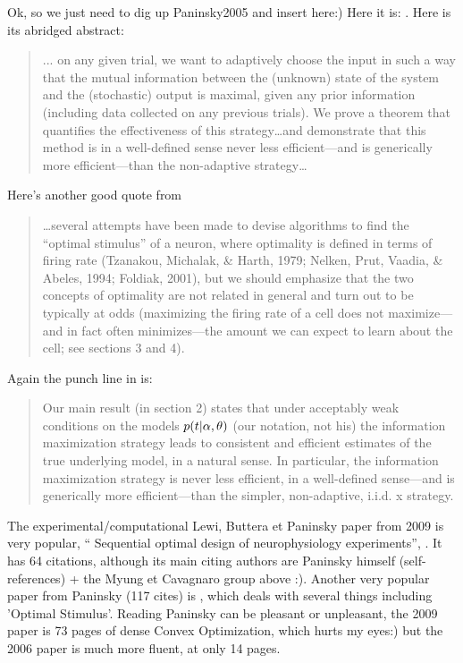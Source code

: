 \documentclass{article}
\begin{document}
Ok, so we just need to dig up Paninsky2005 and insert here:) Here it is:
\cite{Paninski2005}. Here is its abridged abstract:
\begin{quote}
... on any given trial,
we want to adaptively choose the input in such a way that the mutual information
between the (unknown) state of the system and the (stochastic)
output is maximal, given any prior information (including data collected
on any previous trials). We prove a theorem that quantifies the effectiveness
of this strategy\ldots and demonstrate that
this method is in a well-defined sense never less efficient—and is generically
more efficient—than the non-adaptive strategy\ldots  
\end{quote}

Here's another good quote from 
\begin{quote}
\ldots several attempts have been made to devise algorithms
to find the “optimal stimulus” of a neuron, where optimality is
defined in terms of firing rate (Tzanakou, Michalak, & Harth, 1979; Nelken,
Prut, Vaadia, & Abeles, 1994; Foldiak, 2001), but we should emphasize that
the two concepts of optimality are not related in general and turn out to be
typically at odds (maximizing the firing rate of a cell does not maximize—
and in fact often minimizes—the amount we can expect to learn about the
cell; see sections 3 and 4).
\end{quote}
Again the punch line in \cite{Paninski2005} is:
\begin{quote}
Our main result (in section 2) states that under
acceptably weak conditions on the models $p(t| {\alpha}, {\theta})$ (our notation, not
his) the information maximization strategy leads to consistent and
efficient estimates of the true underlying model, in a natural sense. 
In particular, the information maximization
strategy is never less efficient, in a well-defined sense—and
is generically more efficient—than the simpler, non-adaptive, i.i.d. x strategy.
\end{quote}



The experimental/computational Lewi, Buttera et Paninsky paper from 2009 is
very popular, `` Sequential
optimal design of neurophysiology experiments'', \cite{Lewi2009}. It has 64
citations, although its main citing authors are Paninsky himself
(self-references) + the Myung et Cavagnaro group above :). Another very popular
paper from Paninsky (117 cites) is \cite{Paninski2006a}, which deals with
several things including 'Optimal Stimulus'. Reading Paninsky can be pleasant or
unpleasant, the 2009 \cite{Lewi2009}paper is 73 pages of dense Convex
Optimization, which hurts my eyes:) but the 2006 paper is much more fluent, at
only 14 pages. 
\end{document}

